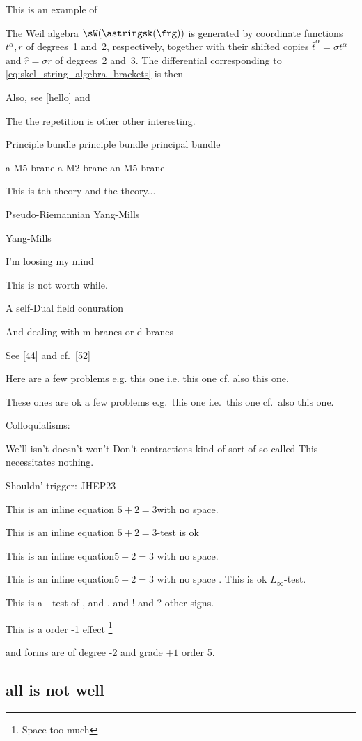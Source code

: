 \documentclass[reqno,a4paper,11pt]{article}
\let\fn\footnote
\renewcommand{\footnote}[1]{\linespread{1.1}\fn{#1}\linespread{1.29}}
\begin{document}
This is an example of

The Weil algebra $\sW(\astringsk(\frg))$ is generated by coordinate functions $t^\alpha, r$ of degrees~1 and~2, respectively, together with their shifted copies $\hat t^\alpha=\sigma t^\alpha$ and $\hat r=\sigma r$ of degrees~2 and~3. The differential corresponding to \eqref{eq:skel_string_algebra_brackets} is then

Also, see \ref{hello} and \cite{whatnot}

The the repetition is other other interesting. 

Principle bundle principle bundle principal bundle

a M5-brane a M2-brane an M5-brane

This is teh theory and the theory...

Pseudo-Riemannian Yang-Mills

Yang-Mills

I'm loosing my mind

This is not worth while.

A self-Dual field conuration

And dealing with m-branes or d-branes

See \ref{44} and cf.~\ref{52}

Here are a few problems e.g. this one i.e. this one cf. also this one.

These ones are ok a few problems e.g.~this one i.e.~this one cf.~also this one.

Colloquialisms:

We'll isn't doesn't won't Don't contractions kind of sort of so-called This necessitates nothing.

Shouldn' trigger: JHEP23

This is an inline equation $5+2=3$with no space.

This is an inline equation $5+2=3$-test is ok

This is an inline equation$5+2=3$ with no space.

This is an inline equation$5+2=3$ with no space .
This is ok {$L_\infty$}-test.

This is a - test of , and . and ! and ? other signs.

This is a order -1 effect \footnote{Space too much}

and forms are of degree -2 and grade $+1$ order 5.

\subsection{all is not well}
\end{document}
